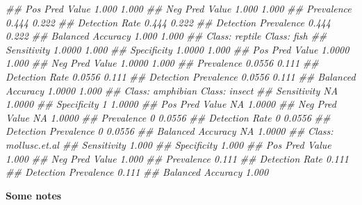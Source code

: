 \documentclass[
  notitlepage]{book}
\newenvironment{Shaded}{\begin{snugshade}}{\end{snugshade}}
\newcommand{\CommentTok}[1]{\textcolor[rgb]{0.56,0.35,0.01}{\textit{#1}}}
\begin{document}
\begin{Shaded}
\begin{Highlighting}[]
\CommentTok{\#\# Pos Pred Value               1.000       1.000}
\CommentTok{\#\# Neg Pred Value               1.000       1.000}
\CommentTok{\#\# Prevalence                   0.444       0.222}
\CommentTok{\#\# Detection Rate               0.444       0.222}
\CommentTok{\#\# Detection Prevalence         0.444       0.222}
\CommentTok{\#\# Balanced Accuracy            1.000       1.000}
\CommentTok{\#\#                      Class: reptile Class: fish}
\CommentTok{\#\# Sensitivity                  1.0000       1.000}
\CommentTok{\#\# Specificity                  1.0000       1.000}
\CommentTok{\#\# Pos Pred Value               1.0000       1.000}
\CommentTok{\#\# Neg Pred Value               1.0000       1.000}
\CommentTok{\#\# Prevalence                   0.0556       0.111}
\CommentTok{\#\# Detection Rate               0.0556       0.111}
\CommentTok{\#\# Detection Prevalence         0.0556       0.111}
\CommentTok{\#\# Balanced Accuracy            1.0000       1.000}
\CommentTok{\#\#                      Class: amphibian Class: insect}
\CommentTok{\#\# Sensitivity                        NA        1.0000}
\CommentTok{\#\# Specificity                         1        1.0000}
\CommentTok{\#\# Pos Pred Value                     NA        1.0000}
\CommentTok{\#\# Neg Pred Value                     NA        1.0000}
\CommentTok{\#\# Prevalence                          0        0.0556}
\CommentTok{\#\# Detection Rate                      0        0.0556}
\CommentTok{\#\# Detection Prevalence                0        0.0556}
\CommentTok{\#\# Balanced Accuracy                  NA        1.0000}
\CommentTok{\#\#                      Class: mollusc.et.al}
\CommentTok{\#\# Sensitivity                         1.000}
\CommentTok{\#\# Specificity                         1.000}
\CommentTok{\#\# Pos Pred Value                      1.000}
\CommentTok{\#\# Neg Pred Value                      1.000}
\CommentTok{\#\# Prevalence                          0.111}
\CommentTok{\#\# Detection Rate                      0.111}
\CommentTok{\#\# Detection Prevalence                0.111}
\CommentTok{\#\# Balanced Accuracy                   1.000}
\end{Highlighting}
\end{Shaded}

\textbf{Some notes}
\end{document}
